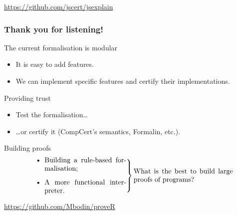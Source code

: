 \documentclass{beamer}
\begin{document}
\begin{frame}[fragile]
    \url{https://github.com/jscert/jsexplain}

\end{frame}

\begin{frame}
    \frametitle{Thank you for listening!}

    \vspace{-1mm}
    \begin{block}{The current formalisation is modular}
        \begin{itemize}
            \item It is easy to add features.
            \item We can implement specific features and certify their implementations.
        \end{itemize}
    \end{block}

    \begin{block}{Providing trust}
        \begin{itemize}
            \item Test the formalisation…
            \item …or certify it (CompCert’s semantics, Formalin, etc.).
        \end{itemize}
    \end{block}

    \begin{block}{Building proofs}
        \vspace{-4mm}
        \[
            \left.
                \mbox{\begin{minipage}{5cm}
                    \begin{itemize}
                        \item Building a rule-based formalisation;
                        \item A more functional interpreter.
                    \end{itemize}
                \end{minipage}}
            \right\} \mbox{\parbox{5cm}{What is the best to build large proofs of programs?}}
        \]
    \end{block}

    \url{https://github.com/Mbodin/proveR}

\end{frame}

\frame{\tableofcontents}

\end{document}
